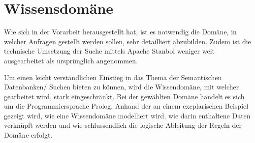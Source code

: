 \chapter{Wissensdomäne}
\label{chap:wissensdomäne}
Wie sich in der Vorarbeit herausgestellt hat, ist es notwendig die Domäne, in welcher Anfragen gestellt werden sollen, sehr detailliert abzubilden. Zudem ist die technische Umsetzung der Suche mittels Apache Stanbol weniger weit ausgearbeitet als ursprünglich angenommen.

Um einen leicht verständlichen Einstieg in das Thema der Semantischen Datenbanken/ Suchen bieten zu können, wird die Wissendomäne, mit welcher gearbeitet wird, stark eingeschränkt. Bei der gewählten Domäne handelt es sich um die Programmiersprache Prolog. Anhand der an einem exeplarischen Beispiel gezeigt wird, wie eine Wissendomäne modelliert wird, wie darin enthaltene Daten verknüpft werden und wie schlussendlich die logische Ableitung der Regeln der Domäne erfolgt.




